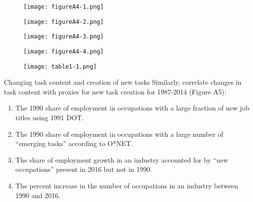 \documentclass[notes=show]{beamer}
\begin{document}
\newpage
\begin{center}
\begin{figure}
\texttt{[image: figureA4-1.png]}
\end{figure} 
\end{center}
\newpage

\newpage
\begin{center}
\begin{figure}
\texttt{[image: figureA4-2.png]}
\end{figure} 
\end{center}
\newpage

\newpage
\begin{center}
\begin{figure}
\texttt{[image: figureA4-3.png]}
\end{figure} 
\end{center}
\newpage

\newpage
\begin{center}
\begin{figure}
\texttt{[image: figureA4-4.png]}
\end{figure} 
\end{center}
\newpage

\newpage
\begin{center}
\begin{figure}
\texttt{[image: table1-1.png]}
\end{figure} 
\end{center}
\newpage

\begin{frame}{Changing task content and creation of new tasks}
Similarly, correlate changes in task content with proxies for new task creation for 1987-2014 (Figure A5): \smallskip
\begin{enumerate}
\item The 1990 share of employment in occupations with a large fraction of new job titles using 1991 DOT. \smallskip
\item The 1990 share of employment in occupations with a large number of ``emerging tasks'' according to O*NET. \smallskip
\item The share of employment growth in an industry accounted for by ``new occupations'' present in 2016 but not in 1990. \smallskip
\item The percent increase in the number of occupations in an industry between 1990 and 2016.
\end{enumerate}
\end{frame}
\end{document}
